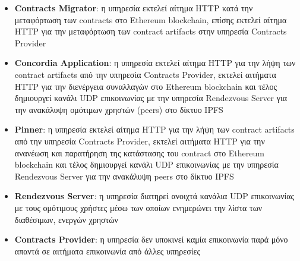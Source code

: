 \begin{itemize}
    \item \textbf{Contracts Migrator}: η υπηρεσία εκτελεί αίτημα HTTP κατά την μεταφόρτωση των \textenglish{contracts} στο Ethereum blockchain, επίσης εκτελεί αίτημα HTTP για την μεταφόρτωση των contract artifacts στην υπηρεσία Contracts Provider

    \item \textbf{Concordia Application}: η υπηρεσία εκτελεί αίτημα HTTP για την λήψη των contract \textenglish{artifacts} από την υπηρεσία Contracts Provider, εκτελεί αιτήματα HTTP για την διενέργεια συναλλαγών στο Ethereum blockchain και τέλος δημιουργεί κανάλι UDP επικοινωνίας με την υπηρεσία Rendezvous Server για την ανακάλυψη ομότιμων χρηστών (peers) στο δίκτυο IPFS

    \item \textbf{Pinner}: η υπηρεσία εκτελεί αίτημα HTTP για την λήψη των contract artifacts από την υπηρεσία Contracts Provider, εκτελεί αιτήματα HTTP για την ανανέωση και παρατήρηση της κατάστασης του contract στο Ethereum blockchain και τέλος δημιουργεί κανάλι UDP επικοινωνίας με την υπηρεσία Rendezvous Server για την ανακάλυψη peers στο δίκτυο IPFS

    \item \textbf{Rendezvous Server}: η υπηρεσία διατηρεί ανοιχτά κανάλια UDP επικοινωνίας με τους ομότιμους χρήστες μέσω των οποίων ενημερώνει την λίστα των διαθέσιμων, ενεργών χρηστών

    \item \textbf{Contracts Provider}: η υπηρεσία δεν υποκινεί καμία επικοινωνία παρά μόνο απαντά σε αιτήματα επικοινωνία από άλλες υπηρεσίες
\end{itemize}